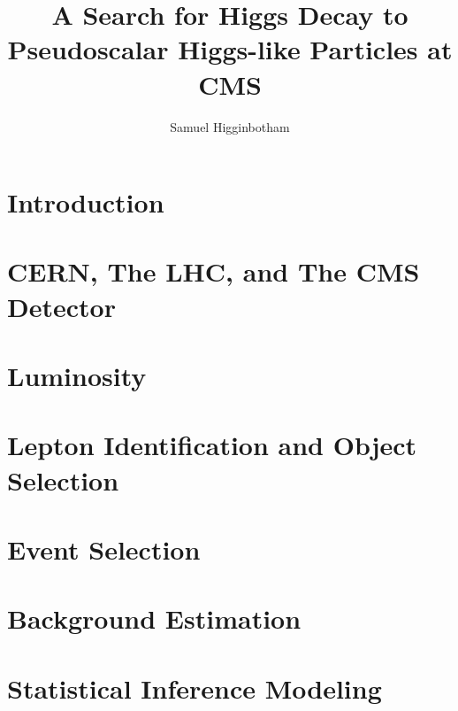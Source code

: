 \documentclass[phd,black]{PrincetonThesis}
\title{A Search for Higgs Decay to Pseudoscalar Higgs-like Particles at CMS}
\author{Samuel Higginbotham}
\begin{document}
\begin{frontmatter}
  \begin{thesisabstract}
    
  \end{thesisabstract}
  \begin{acknowledgements}
    
  \end{acknowledgements}
\end{frontmatter}
\graphicspath{{/mnt/c/Users/Sam Higginbotham/Dropbox/HAA/}{/mnt/c/Users/Sam Higginbotham/Dropbox/HAA/plots/}{/mnt/c/Users/Sam Higginbotham/Dropbox/HAA/paper/AN-20-208/}{/mnt/c/Users/Sam Higginbotham/Dropbox/MyPhD/figures}}



\chapter{Introduction}
\label{chap:Introduction}


\chapter{CERN, The LHC, and The CMS Detector}
\label{chap:cmsdet}


\chapter{Luminosity}
\label{chap:lumi}


\chapter{Lepton Identification and Object Selection}
\label{chap:samples}


\chapter{Event Selection}
\label{chap:selection}


\chapter{Background Estimation}
\label{chap:background}


\chapter{Statistical Inference Modeling}
\label{chap:stat}


\end{document}
